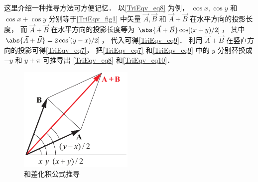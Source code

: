 这里介绍一种推导方法可方便记忆． 以\autoref{TriEqv_eq8} 为例， $\cos x, \cos y$ 和 $\cos x + \cos y$ 分别等于\autoref{TriEqv_fig1} 中矢量 $\vec A, \vec B$ 和 $\vec A + \vec B$ 在水平方向的投影长度， 而 $\vec A + \vec B$ 在水平方向的投影长度等为 $\abs{\vec A + \vec B}\cos[(x+y)/2]$， 其中 $\abs{\vec A + \vec B} = 2\cos [(y-x)/2]$， 代入可得\autoref{TriEqv_eq9}． 利用 $\vec A + \vec B$ 在竖直方向的投影可得\autoref{TriEqv_eq7}， 把\autoref{TriEqv_eq7} 和\autoref{TriEqv_eq9} 中的 $y$ 分别替换成 $-y$ 和 $y+\pi$ 可推导出 \autoref{TriEqv_eq8} 和\autoref{TriEqv_eq10}．
\begin{figure}[h]
\centering
\includegraphics[width=5.5cm]{./figures/TriEqv.pdf}
\caption{和差化积公式推导} \label{TriEqv_fig1}
\end{figure}